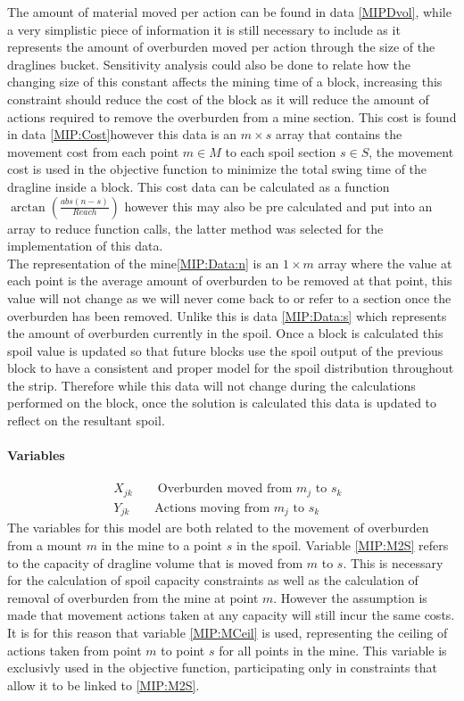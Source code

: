 The amount of material moved per action can be found in data \ref{MIPDvol}, while a very simplistic piece of information it is still necessary to include as it represents the amount of overburden moved per action through the size of the draglines bucket. Sensitivity analysis could also be done to relate how the changing size of this constant affects the mining time of a block, increasing this constraint should reduce the cost of the block as it will reduce the amount of actions required to remove the overburden from a mine section. This cost is found in data \ref{MIP:Cost}however this data is an $m\times s$ array that contains the movement cost from each point $m\in M$ to each spoil section $s \in S$, the movement cost is used in the objective function to minimize the total swing time of the dragline inside a block. This cost data can be calculated as a function $\arctan(\frac{abs(n-s)}{Reach})$ however this may also be pre calculated and put into an array to reduce function calls, the latter method was selected for the implementation of this data. 
\\
The representation of the mine\ref{MIP:Data:n} is an $1\times m$ array where the value at each point is the average amount of overburden to be removed at that point, this value will not change as we will never come back to or refer to a section once the overburden has been removed. Unlike this is data \ref{MIP:Data:s} which represents the amount of overburden currently in the spoil. Once a block is calculated this spoil value is updated so that future blocks use the spoil output of the previous block to have a consistent and proper model for the spoil distribution throughout the strip. Therefore while this data will not change during the calculations performed on the block, once the solution is calculated this data is updated to reflect on the resultant spoil. 
\paragraph*{Variables}
\begin{align}
\label{MIP:M2S}
X_{jk} \qquad \text{Overburden moved from $m_{j}$ to $s_k$ }\\
\label{MIP:MCeil}
Y_{jk} \qquad \text{Actions moving from $m_{j}$ to $s_k$ }
\end{align}
The variables for this model are both related to the movement of overburden from a mount $m$ in the mine to a point $s$ in the spoil. Variable \ref{MIP:M2S} refers to the capacity of dragline volume that is moved from $m$ to $s$. This is necessary for the calculation of spoil capacity constraints as well as the calculation of removal of overburden from the mine at point $m$. However the assumption is made that movement actions taken at any capacity will still incur the same costs. It is for this reason that variable \ref{MIP:MCeil} is used, representing the ceiling of actions taken from point $m$ to point $s$ for all points in the mine. This variable is exclusivly used in the objective function, participating only in constraints that allow it to be linked to \ref{MIP:M2S}.
